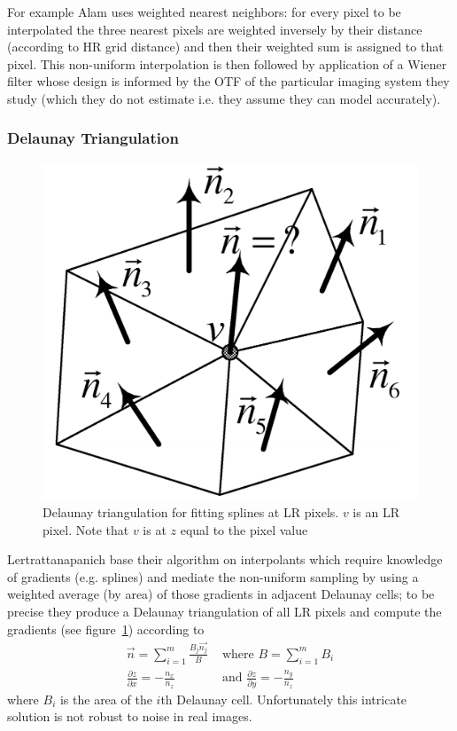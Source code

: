 For example Alam \cite{Alam2000} uses weighted nearest neighbors: for every pixel to be interpolated the three nearest pixels are weighted inversely by their distance (according to HR grid distance) and then their weighted sum is assigned to that pixel.
%
This non-uniform interpolation is then followed by application of a Wiener filter whose design is informed by the OTF of the particular imaging system they study (which they do not estimate i.e. they assume they can model accurately).
%
\subsubsection{Delaunay Triangulation}

\begin{figure}
	\centering
	\includegraphics[width=.7\linewidth]{figures/classical/delauney.png}
	\caption{Delaunay triangulation for fitting splines at LR pixels\cite{Lertrattanapanich}. $v$ is an LR pixel. Note that $v$ is at $z$ equal to the pixel value}
	\label{fig:delauney}
\end{figure}
Lertrattanapanich \cite{Lertrattanapanich} base their algorithm on interpolants which require knowledge of gradients (e.g. splines) and mediate the non-uniform sampling by using a weighted average (by area) of those gradients in adjacent Delaunay cells; to be precise they produce a Delaunay triangulation of all LR pixels and compute the gradients (see figure~\ref{fig:delauney}) according to
\begin{align*}
	\vec{n} = \sum_{i=1}^m \frac{B_j \vec{n_j}}{B}   & \text{ where } B=\sum_{i=1}^m B_i                              \\
	\frac{\partial z}{\partial x} = -\frac{n_x}{n_z} & \text{ and }  \frac{\partial z}{\partial y} = -\frac{n_y}{n_z}
\end{align*}
where $B_i$ is the area of the $i$th Delaunay cell.
%
Unfortunately this intricate solution is not robust to noise in real images.
